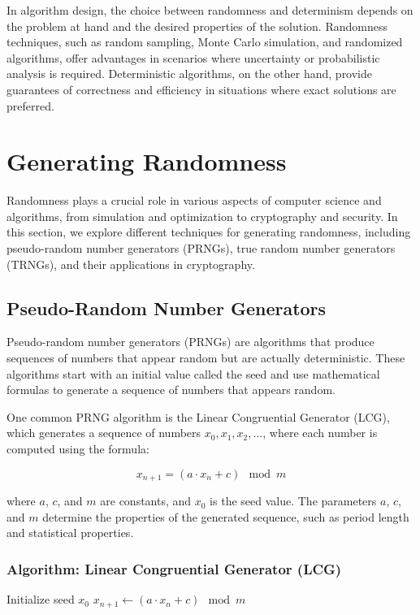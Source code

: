 \documentclass[12pt]{book} %
\begin{document}
In algorithm design, the choice between randomness and determinism depends on the problem at hand and the desired properties of the solution. Randomness techniques, such as random sampling, Monte Carlo simulation, and randomized algorithms, offer advantages in scenarios where uncertainty or probabilistic analysis is required. Deterministic algorithms, on the other hand, provide guarantees of correctness and efficiency in situations where exact solutions are preferred.

\section{Generating Randomness}

Randomness plays a crucial role in various aspects of computer science and algorithms, from simulation and optimization to cryptography and security. In this section, we explore different techniques for generating randomness, including pseudo-random number generators (PRNGs), true random number generators (TRNGs), and their applications in cryptography.

\subsection{Pseudo-Random Number Generators}

Pseudo-random number generators (PRNGs) are algorithms that produce sequences of numbers that appear random but are actually deterministic. These algorithms start with an initial value called the seed and use mathematical formulas to generate a sequence of numbers that appears random.

One common PRNG algorithm is the Linear Congruential Generator (LCG), which generates a sequence of numbers \(x_0, x_1, x_2, ...\), where each number is computed using the formula:

\[x_{n+1} = (a \cdot x_n + c) \mod m\]

where \(a\), \(c\), and \(m\) are constants, and \(x_0\) is the seed value. The parameters \(a\), \(c\), and \(m\) determine the properties of the generated sequence, such as period length and statistical properties.

\subsubsection{Algorithm: Linear Congruential Generator (LCG)}
\FloatBarrier
\begin{algorithm}
\caption{Linear Congruential Generator (LCG)}
\begin{algorithmic}
\State Initialize seed \(x_0\)
    \State $x_{n+1} \leftarrow (a \cdot x_n + c) \mod m$
\EndFor
\end{algorithmic}
\end{algorithm}
\FloatBarrier
\end{document}
